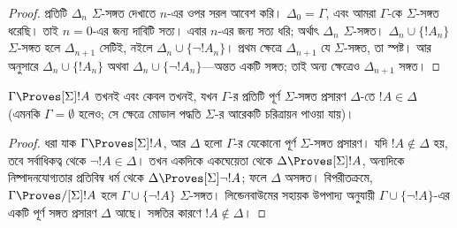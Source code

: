\documentclass[../../../include/open-logic-section]{subfiles}
\begin{document}
\begin{proof}
প্রতিটি $\Delta_n$ $\Sigma$-সঙ্গত দেখাতে $n$-এর ওপর সরল আবেশ করি। $\Delta_0 = \Gamma$, এবং আমরা $\Gamma$-কে $\Sigma$-সঙ্গত ধরেছি। তাই $n = 0$-এর জন্য দাবিটি সত্য। এবার $n$-এর জন্য সত্য ধরি; অর্থাৎ $\Delta_n$ $\Sigma$-সঙ্গত। $\Delta_n \cup \{!A_n\}$ $\Sigma$-সঙ্গত হলে $\Delta_{n+1}$ সেটিই, নইলে $\Delta_n \cup \{\lnot!A_n\}$। প্রথম ক্ষেত্রে $\Delta_{n+1}$ যে $\Sigma$-সঙ্গত, তা স্পষ্ট। আর  অনুসারে $\Delta_n \cup \{!A_n\}$ অথবা $\Delta_n \cup \{\lnot!A_n\}$—অন্তত একটি সঙ্গত; তাই অন্য ক্ষেত্রেও $\Delta_{n+1}$ সঙ্গত।
\end{proof}

\begin{cor}
  $\Gamma \Proves[\Sigma] !A$ তখনই এবং কেবল তখনই, যখন $\Gamma$-র প্রতিটি পূর্ণ $\Sigma$-সঙ্গত প্রসারণ $\Delta$-তে $!A \in \Delta$ (এমনকি $\Gamma = \emptyset$ হলেও; সে ক্ষেত্রে মোডাল পদ্ধতি $\Sigma$-র আরেকটি চরিত্রায়ন পাওয়া যায়)।
\end{cor}

\begin{proof}
  ধরা যাক $\Gamma \Proves[\Sigma] !A$, আর $\Delta$ হলো $\Gamma$-র যেকোনো পূর্ণ $\Sigma$-সঙ্গত প্রসারণ। যদি $!A \notin \Delta$ হয়, তবে সর্বাধিকত্ব থেকে $\lnot!A \in \Delta$। তখন একদিকে একঘেয়েতা থেকে $\Delta \Proves[\Sigma] !A$, অন্যদিকে নিষ্পাদনযোগ্যতার প্রতিবিম্ব ধর্ম থেকে $\Delta \Proves[\Sigma] \lnot!A$; ফলে $\Delta$ অসঙ্গত। বিপরীতক্রমে, $\Gamma \Proves/[\Sigma] !A$ হলে $\Gamma \cup \{ \lnot!A\}$ $\Sigma$-সঙ্গত। লিন্ডেনবাউমের সহায়ক উপপাদ্য অনুযায়ী $\Gamma \cup \{ \lnot!A \}$-এর একটি পূর্ণ সঙ্গত প্রসারণ $\Delta$ আছে। সঙ্গতির কারণে $!A \notin \Delta$।
\end{proof}
\end{document}
